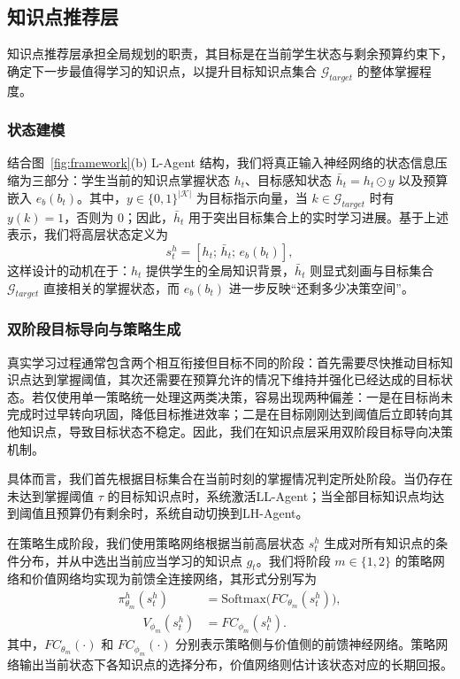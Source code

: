 \documentclass[11pt,a4paper]{article}
\begin{document}
\subsection{知识点推荐层}
知识点推荐层承担全局规划的职责，其目标是在当前学生状态与剩余预算约束下，确定下一步最值得学习的知识点，以提升目标知识点集合 $\mathcal{G}_{target}$ 的整体掌握程度。

\subsubsection{状态建模}

结合图~\ref{fig:framework}(b) L-Agent 结构，我们将真正输入神经网络的状态信息压缩为三部分：学生当前的知识点掌握状态 $h_t$、目标感知状态 $\bar{h}_t=h_t\odot y$ 以及预算嵌入 $e_b(b_t)$。其中，$y\in\{0,1\}^{|\mathcal{K}|}$ 为目标指示向量，当 $k\in\mathcal{G}_{target}$ 时有 $y(k)=1$，否则为 $0$；因此，$\bar{h}_t$ 用于突出目标集合上的实时学习进展。基于上述表示，我们将高层状态定义为
\begin{equation}
s_t^h=[h_t;\,\bar{h}_t;\,e_b(b_t)],
\end{equation}
这样设计的动机在于：$h_t$ 提供学生的全局知识背景，$\bar{h}_t$ 则显式刻画与目标集合 $\mathcal{G}_{target}$ 直接相关的掌握状态，而 $e_b(b_t)$ 进一步反映“还剩多少决策空间”。


\subsubsection{双阶段目标导向与策略生成}

真实学习过程通常包含两个相互衔接但目标不同的阶段：首先需要尽快推动目标知识点达到掌握阈值，其次还需要在预算允许的情况下维持并强化已经达成的目标状态。若仅使用单一策略统一处理这两类决策，容易出现两种偏差：一是在目标尚未完成时过早转向巩固，降低目标推进效率；二是在目标刚刚达到阈值后立即转向其他知识点，导致目标状态不稳定。因此，我们在知识点层采用双阶段目标导向决策机制。

具体而言，我们首先根据目标集合在当前时刻的掌握情况判定所处阶段。当仍存在未达到掌握阈值 $\tau$ 的目标知识点时，系统激活LL-Agent；当全部目标知识点均达到阈值且预算仍有剩余时，系统自动切换到LH-Agent。

在策略生成阶段，我们使用策略网络根据当前高层状态 $s_t^h$ 生成对所有知识点的条件分布，并从中选出当前应当学习的知识点 $g_t$。我们将阶段 $m\in\{1,2\}$ 的策略网络和价值网络均实现为前馈全连接网络，其形式分别写为
\begin{equation}
\begin{aligned}
\pi_{\theta_m}^h( s_t^h)
&=
\mathrm{Softmax}\!\big(FC_{\theta_m}(s_t^h)\big),\\
\qquad
V_{\phi_m}(s_t^h)&=FC_{\phi_m}(s_t^h).
\end{aligned}
\end{equation}
其中，$FC_{\theta_m}(\cdot)$ 和 $FC_{\phi_m}(\cdot)$ 分别表示策略侧与价值侧的前馈神经网络。策略网络输出当前状态下各知识点的选择分布，价值网络则估计该状态对应的长期回报。
\end{document}
